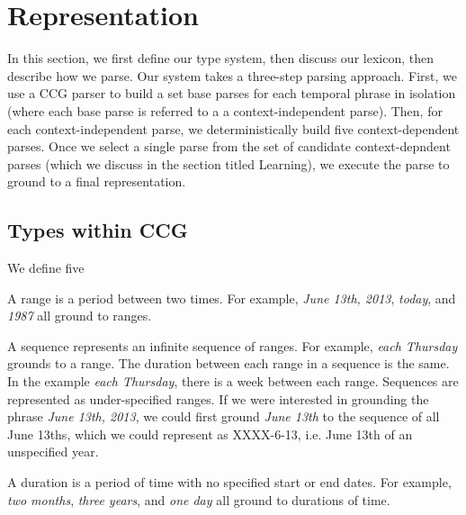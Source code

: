 \section{Representation}
\label{sec:representation}

In this section, we first define our type system, then discuss our lexicon, then describe how we parse. Our system takes a three-step parsing approach. First, we use a CCG parser to build a set base parses for each temporal phrase in isolation (where each base parse is referred to a a context-independent parse). Then, for each context-independent parse, we deterministically build five context-dependent parses. Once we select a single parse from the set of candidate context-depndent parses (which we discuss in the section titled Learning), we execute the parse to ground to a final representation.

\subsection{Types within CCG}
\label{sec:CCGtypes}
We define five 

\begin{definition}[Range]
A range is a period between two times. For example, \emph{June 13th, 2013}, \emph{today}, and \emph{1987} all ground to ranges.
\end{definition}

\begin{definition}[Sequence] 
A sequence represents an infinite sequence of ranges. For example, \emph{each Thursday} grounds to a range. The duration between each range in a sequence is the same. In the example \emph{each Thursday}, there is a week between each range. Sequences are represented as under-specified ranges. If we were interested in grounding the phrase \emph{June 13th, 2013}, we could first ground \emph{June 13th} to the sequence of all June 13ths, which we could represent as XXXX-6-13, i.e. June 13th of an unspecified year.
\end{definition}

\begin{definition}[Duration]
A duration is a period of time with no specified start or end dates. For example, \emph{two months}, \emph{three years}, and \emph{one day} all ground to durations of time. 
\end{definition}

